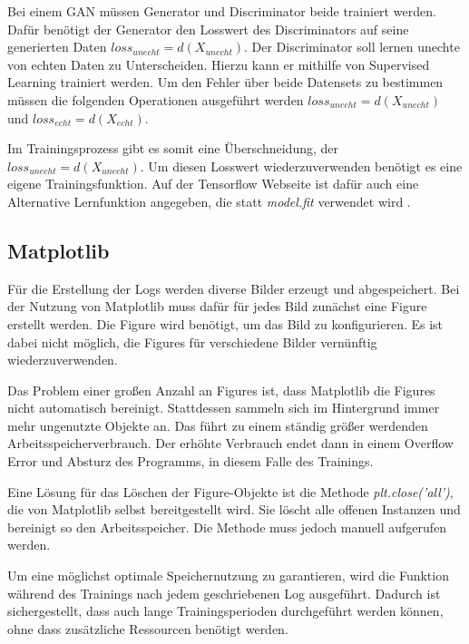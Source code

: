 Bei einem GAN müssen Generator und Discriminator beide trainiert werden.
Dafür benötigt der Generator den Losswert des Discriminators auf seine generierten Daten $loss_{unecht} = d(X_{unecht})$.
Der Discriminator soll lernen unechte von echten Daten zu Unterscheiden.
Hierzu kann er mithilfe von Supervised Learning trainiert werden.
Um den Fehler über beide Datensets zu bestimmen müssen die folgenden Operationen ausgeführt werden $loss_{unecht} = d(X_{unecht})$ und $loss_{echt} = d(X_{echt})$.
\newline

Im Trainingsprozess gibt es somit eine Überschneidung, der $loss_{unecht} = d(X_{unecht})$.
Um diesen Losswert wiederzuverwenden benötigt es eine eigene Trainingsfunktion.
Auf der Tensorflow Webseite ist dafür auch eine Alternative Lernfunktion angegeben, die statt \textit{model.fit} verwendet wird \cite{tensorflow-gan-learn-step}.

\subsection{Matplotlib}
Für die Erstellung der Logs werden diverse Bilder erzeugt und abgespeichert.
Bei der Nutzung von Matplotlib muss dafür für jedes Bild zunächst eine Figure erstellt werden.
Die Figure wird benötigt, um das Bild zu konfigurieren.
Es ist dabei nicht möglich, die Figures für verschiedene Bilder vernünftig wiederzuverwenden.
\newline

Das Problem einer großen Anzahl an Figures ist, dass Matplotlib die Figures nicht automatisch bereinigt.
Stattdessen sammeln sich im Hintergrund immer mehr ungenutzte Objekte an.
Das führt zu einem ständig größer werdenden Arbeitsspeicherverbrauch.
Der erhöhte Verbrauch endet dann in einem Overflow Error und Absturz des Programms, in diesem Falle des Trainings.
\newline

Eine Lösung für das Löschen der Figure-Objekte ist die Methode \textit{plt.close('all')}, die von Matplotlib selbst bereitgestellt wird.
Sie löscht alle offenen Instanzen und bereinigt so den Arbeitsspeicher.
Die Methode muss jedoch manuell aufgerufen werden.
\newline

Um eine möglichst optimale Speichernutzung zu garantieren, wird die Funktion während des Trainings nach jedem geschriebenen Log ausgeführt.
Dadurch ist sichergestellt, dass auch lange Trainingsperioden durchgeführt werden können, ohne dass zusätzliche Ressourcen benötigt werden.

